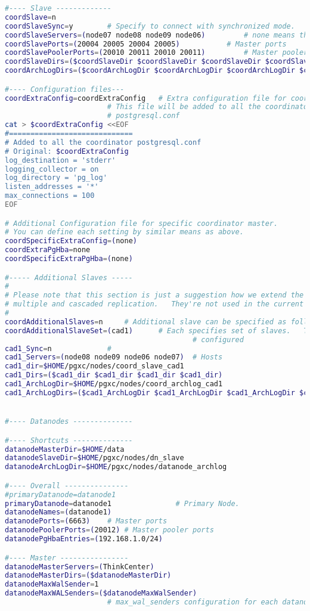 \begin{lstlisting}[language=bash,caption={Konfigurationsdatei pgxc-ctl}]
#---- Slave -------------
coordSlave=n			
coordSlaveSync=y		# Specify to connect with synchronized mode.
coordSlaveServers=(node07 node08 node09 node06)			# none means this slave is not available
coordSlavePorts=(20004 20005 20004 20005)			# Master ports
coordSlavePoolerPorts=(20010 20011 20010 20011)			# Master pooler ports
coordSlaveDirs=($coordSlaveDir $coordSlaveDir $coordSlaveDir $coordSlaveDir)
coordArchLogDirs=($coordArchLogDir $coordArchLogDir $coordArchLogDir $coordArchLogDir)

#---- Configuration files---
coordExtraConfig=coordExtraConfig	# Extra configuration file for coordinators.  
						# This file will be added to all the coordinators'
						# postgresql.conf
cat > $coordExtraConfig <<EOF
#=============================
# Added to all the coordinator postgresql.conf
# Original: $coordExtraConfig
log_destination = 'stderr'
logging_collector = on
log_directory = 'pg_log'
listen_addresses = '*'
max_connections = 100
EOF

# Additional Configuration file for specific coordinator master.
# You can define each setting by similar means as above.
coordSpecificExtraConfig=(none)
coordExtraPgHba=none	
coordSpecificExtraPgHba=(none)

#----- Additional Slaves -----
#
# Please note that this section is just a suggestion how we extend the configuration for
# multiple and cascaded replication.   They're not used in the current version.
#
coordAdditionalSlaves=n		# Additional slave can be specified as follows: where you
coordAdditionalSlaveSet=(cad1)		# Each specifies set of slaves.   This case, two set of slaves are
											# configured
cad1_Sync=n		  		#
cad1_Servers=(node08 node09 node06 node07)	# Hosts
cad1_dir=$HOME/pgxc/nodes/coord_slave_cad1
cad1_Dirs=($cad1_dir $cad1_dir $cad1_dir $cad1_dir)
cad1_ArchLogDir=$HOME/pgxc/nodes/coord_archlog_cad1
cad1_ArchLogDirs=($cad1_ArchLogDir $cad1_ArchLogDir $cad1_ArchLogDir $cad1_ArchLogDir)


#---- Datanodes --------------

#---- Shortcuts --------------
datanodeMasterDir=$HOME/data
datanodeSlaveDir=$HOME/pgxc/nodes/dn_slave
datanodeArchLogDir=$HOME/pgxc/nodes/datanode_archlog

#---- Overall ---------------
#primaryDatanode=datanode1				
primaryDatanode=datanode1				# Primary Node.
datanodeNames=(datanode1)
datanodePorts=(6663)	# Master ports
datanodePoolerPorts=(20012)	# Master pooler ports
datanodePgHbaEntries=(192.168.1.0/24)	

#---- Master ----------------
datanodeMasterServers=(ThinkCenter)	
datanodeMasterDirs=($datanodeMasterDir)
datanodeMaxWalSender=1
datanodeMaxWALSenders=($datanodeMaxWalSender)
						# max_wal_senders configuration for each datanode


\end{lstlisting}
